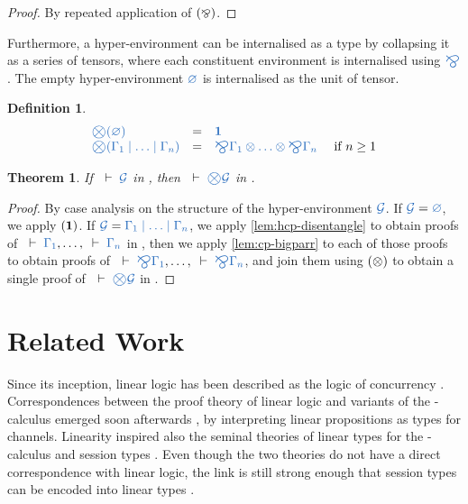 \documentclass[submission,copyright,creativecommons]{eptcs}
\newtheorem{theorem}[lemma]{Theorem}
\newtheorem{definition}[lemma]{Definition}
\begin{document}
\begin{proof}
  By repeated application of $(\mathbin{\bindnasrepma})$.
\end{proof}\noindent
Furthermore, a hyper-environment can be internalised as a type by collapsing it as a series of tensors, where each constituent environment is internalised using $\ty{\bigparr}$. The empty hyper-environment $\ty{\emptyhypercontext}$ is internalised as the unit of tensor.
\begin{definition}\label{def:bigtens}
  \[
  \begin{array}{lcll}
    \ty{\bigtens(\emptyhypercontext)}
    & = & \ty{\one}
    \\
    \ty{\bigtens(\Gamma_1 \hsep \dots \hsep \Gamma_n)}
    & = & \ty{\bigparr\Gamma_1 \tens \dots \tens \bigparr\Gamma_n}
    & \text{ if } n \geq 1
  \end{array}
  \]
\end{definition}\noindent

\begin{theorem}\label{thm:hcp2cp-bigtens}
  If $\seq{\mathcal{G}}$ in \hcp, then $\seq{\bigtens\mathcal{G}}$ in \cp.
\end{theorem} 
\begin{proof}
  By case analysis on the structure of the hyper-environment $\ty{\mathcal{G}}$.
  If $\ty{\mathcal{G}} = \ty{\emptyhypercontext}$, we apply $(\mathbf{1})$.
  If $\ty{\mathcal{G}} = \ty{\Gamma_1 \hsep \dots \hsep \Gamma_n}$, we apply \cref{lem:hcp-disentangle} to obtain proofs of $\seq{\Gamma_1}, \dots, \seq{\Gamma_n}$ in \cp, then we apply \cref{lem:cp-bigparr} to each of those proofs to obtain proofs of $\seq{\bigparr\Gamma_1}, \dots, \seq{\bigparr\Gamma_n}$, and join them using $(\otimes)$ to obtain a single proof of $\seq{\bigtens\mathcal{G}}$ in \cp.
\end{proof}\noindent

\section{Related Work}
\label{sec:related-work}

Since its inception, linear logic has been described as the logic of concurrency \cite{girard1987}. Correspondences between the proof theory of linear logic and variants of the \textpi-calculus emerged soon afterwards \cite{abramsky1994,bellin1994}, by interpreting linear propositions as types for channels. Linearity inspired also the seminal theories of linear types for the \textpi-calculus \cite{kobayashi1999} and session types \cite{honda1998}. Even though the two theories do not have a direct correspondence with linear logic, the link is still strong enough that session types can be encoded into linear types \cite{dardha2017}.
\end{document}
